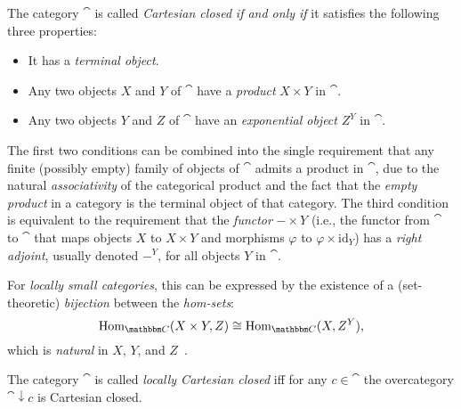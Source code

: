\documentclass[a4paper,11pt]{article}  %
\begin{document}
\begin{definition}
The category $\cat$ is called \emph{Cartesian closed} \emph{if and only if} it satisfies the following three properties:

\begin{itemize}
    \item It has a \emph{terminal object}.
    \item Any two objects \(X\) and \(Y\) of $\cat$ have a \emph{product} \(X \times Y\) in $\cat$.
    \item Any two objects \(Y\) and \(Z\) of $\cat$ have an \emph{exponential object} \(Z^Y\) in $\cat$.
\end{itemize}
\end{definition}

\begin{remark}
	The first two conditions can be combined into the single requirement that any finite (possibly empty) family of objects of $\cat$ admits a product in $\cat$, due to the natural \emph{associativity} of the categorical product and the fact that the \emph{empty product} in a category is the terminal object of that category.
	The third condition is equivalent to the requirement that the \emph{functor} \(- \times Y\) (i.e., the functor from $\cat$ to $\cat$ that maps objects \(X\) to \(X \times Y\) and morphisms \(\varphi\) to \(\varphi \times \mathrm{id}_Y\)) has a \emph{right adjoint}, usually denoted \(-^Y\), for all objects \(Y\) in $\cat$. 
	
	For \emph{locally small categories}, this can be expressed by the existence of a (set-theoretic) \emph{bijection} between the \emph{hom-sets}:
\[
\Hom_{\cat}(X \times Y, Z) \cong \Hom_{\cat}(X, Z^Y),
\]
	which is \emph{natural} in \(X\), \(Y\), and \(Z\)~\cite{nlab:cartesian_closed_category}.
\end{remark}

\begin{definition}
	The category $\cat$ is called \emph{locally Cartesian closed} iff for any $c \in\cat$ the overcategory $\cat \downarrow c$ is Cartesian closed.
\end{definition}


			
			
\end{document}
